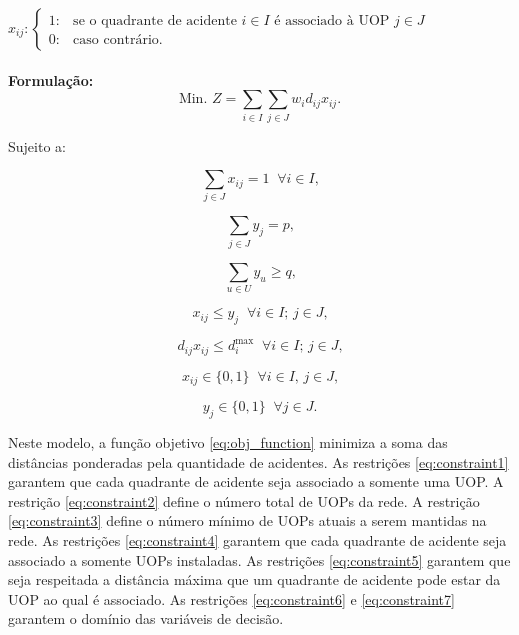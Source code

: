 $
    x_{ij} \colon
    \begin{cases}
      1: & \text{se o quadrante de acidente }i \in I \text{ é associado à UOP }j \in J\\
      0: & \text{caso contrário.}
    \end{cases}
$ \\ \\

\hline
\textbf{Formulação:}
\begin{equation} \label{eq:obj_function}
\text{Min. }Z = \sum\limits_{i \in I} \sum\limits_{j \in J} w_i d_{ij} x_{ij}.
\end{equation}

Sujeito a:

\begin{equation} \label{eq:constraint1}
\sum\limits_{j \in J} x_{ij} = 1 \;\; \forall i \in I \text{,}
\end{equation}

\begin{equation} \label{eq:constraint2}
\sum\limits_{j \in J} y_{j} = p \text{,}
\end{equation}

\begin{equation} \label{eq:constraint3}
\sum\limits_{u \in U} y_{u} \geq q \text{,}
\end{equation}

\begin{equation} \label{eq:constraint4}
x_{ij} \leq y_j \;\; \forall i \in I \text{; }j \in J\text{,}
\end{equation}

\begin{equation} \label{eq:constraint5}
d_{ij} x_{ij} \leq d_i^\text{max} \;\; \forall i \in I \text{; }j \in J\text{,}
\end{equation}

\begin{equation} \label{eq:constraint6}
x_{ij} \in \{0,1\} \;\; \forall i \in I \text{, }j \in J\text{,}
\end{equation}

\begin{equation} \label{eq:constraint7}
y_j \in \{0,1\} \;\; \forall j \in J\text{.}
\end{equation}

Neste modelo, a função objetivo \ref{eq:obj_function} minimiza a soma das distâncias ponderadas pela quantidade de acidentes. As restrições \ref{eq:constraint1} garantem que cada quadrante de acidente seja associado a somente uma UOP. A restrição \ref{eq:constraint2} define o número total de UOPs da rede. A restrição \ref{eq:constraint3} define o número mínimo de UOPs atuais a serem mantidas na rede. As restrições \ref{eq:constraint4} garantem que cada quadrante de acidente seja associado a somente UOPs instaladas. As restrições \ref{eq:constraint5} garantem que seja respeitada a distância máxima que um quadrante de acidente pode estar da UOP ao qual é associado. As restrições \ref{eq:constraint6} e \ref{eq:constraint7} garantem o domínio das variáveis de decisão.

